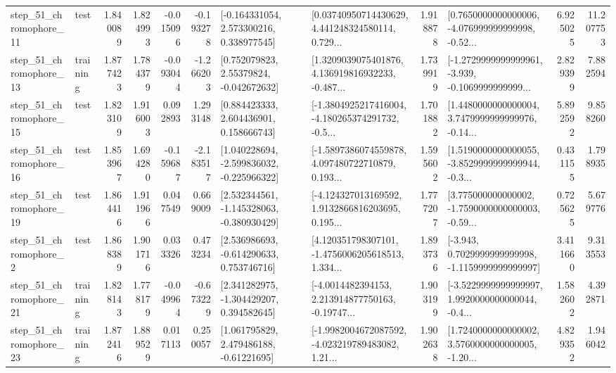 \begin{tabular}{llrrrrllrlrr}
   step\_51\_chromophore\_11 &      test &      1.840089 &    1.824993 &     -0.015096 & -0.193278 &    [-0.164331054, 2.573300216, 0.338977545] &  [0.03740950714430629, 4.441248324580114, 0.729... &       1.918878 &  [0.7650000000000006, -4.076999999999998, -0.52... &            6.925025 &         11.207753 \\
   step\_51\_chromophore\_13 &  training &      1.877423 &    1.784379 &     -0.093044 & -1.266203 &     [0.752079823, 2.55379824, -0.042672632] &  [1.3209039075401876, 4.136919816932233, -0.487... &       1.739919 &  [-1.2729999999999961, -3.939, -0.1069999999999... &            2.829399 &          7.882594 \\
   step\_51\_chromophore\_15 &      test &      1.823109 &    1.916003 &      0.092893 &  1.293148 &     [0.884423333, 2.604436901, 0.158666743] &  [-1.3804925217416004, -4.180265374291732, -0.5... &       1.701882 &  [1.4480000000000004, 3.7479999999999976, -0.14... &            5.892592 &          9.858260 \\
   step\_51\_chromophore\_16 &      test &      1.853967 &    1.694280 &     -0.159687 & -2.183517 &   [1.040228694, -2.599836032, -0.225966322] &  [-1.5897386074559878, 4.097480722710879, 0.193... &       1.595602 &  [1.5190000000000055, -3.8529999999999944, -0.3... &            0.431155 &          1.798935 \\
   step\_51\_chromophore\_19 &      test &      1.864416 &    1.911966 &      0.047549 &  0.669009 &   [2.532344561, -1.145328063, -0.380930429] &  [-4.124327013169592, 1.9132866816203695, 0.195... &       1.777207 &  [3.775000000000002, -1.7590000000000003, -0.59... &            0.725625 &          5.679776 \\
    step\_51\_chromophore\_2 &      test &      1.868389 &    1.901716 &      0.033326 &  0.473234 &    [2.536986693, -0.614290633, 0.753746716] &  [4.120351798307101, -1.4756006205618513, 1.334... &       1.893736 &  [-3.943, 0.7029999999999998, -1.1159999999999997] &            3.411660 &          9.313553 \\
   step\_51\_chromophore\_21 &  training &      1.828143 &    1.778179 &     -0.049964 & -0.673229 &    [2.341282975, -1.304429207, 0.394582645] &  [-4.0014482394153, 2.213914877750163, -0.19747... &       1.903199 &  [-3.5229999999999997, 1.9920000000000044, -0.4... &            1.582602 &          4.392871 \\
   step\_51\_chromophore\_23 &  training &      1.872416 &    1.889529 &      0.017113 &  0.250057 &     [1.061795829, 2.479486188, -0.61221695] &  [-1.9982004672087592, -4.023219789483082, 1.21... &       1.902638 &  [1.7240000000000002, 3.5760000000000005, -1.20... &            4.829352 &          1.946042 \\

\end{tabular}

